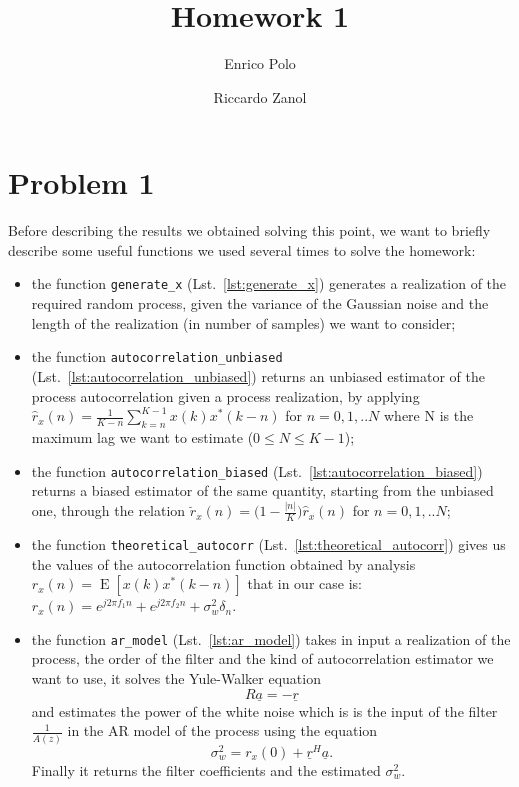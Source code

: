 \documentclass{article}
\author{Enrico Polo \and Riccardo Zanol}
\title{Homework 1}
\newcommand{\inlinecode}[1]{\lstinline[basicstyle=\ttfamily,
    keywordstyle={}]{#1}}
\renewcommand{\vec}[1]{\underline{#1}}
\newcommand{\E}[1]{\operatorname{E}\left[#1\right]}
\begin{document}
\maketitle
\section*{Problem 1}
Before describing the results we obtained solving this point, we want to briefly describe some useful functions we used several times to solve the homework:
\begin{itemize}
 \item the function \inlinecode{generate_x} (Lst.~\ref{lst:generate_x}) generates a realization of the required random process, given the variance of the Gaussian noise and the length of the realization (in number of samples) we want to consider;
 \item the function \inlinecode{autocorrelation_unbiased} (Lst.~\ref{lst:autocorrelation_unbiased}) returns an unbiased estimator of the process autocorrelation given a process realization, by applying $\hat{r}_x(n) = \frac{1}{K-n} \sum_{k=n}^{K-1} {x(k)x^*(k-n)}$ for $n = 0,1,..N$ where N is the maximum lag we want to estimate ($0\leq N \leq K-1$);
 \item the function \inlinecode{autocorrelation_biased} (Lst.~\ref{lst:autocorrelation_biased}) returns a biased estimator of the same quantity, starting from the unbiased one, through the relation $\breve{r}_x(n) = \bigl( 1 - \frac{|n|}{K}\bigr) \hat{r}_x(n)$ for $n = 0,1,..N$;
 \item  the function \inlinecode{theoretical_autocorr} (Lst.~\ref{lst:theoretical_autocorr}) gives us the values of the autocorrelation function obtained by analysis $r_x (n) =  \E{x(k)x^*(k-n)}$ that in our case is: $r_x (n) = e^{j2 \pi f_1n} + e^{j2\pi f_2n} + \sigma_w^2 \delta_n$.
 \item the function \inlinecode{ar_model} (Lst.~\ref{lst:ar_model})
   takes in input a realization of the process, the order of the
   filter and the kind of autocorrelation estimator we want to use, it
   solves the Yule-Walker equation
   \[ R\vec{a} = -\vec{r} \]
   and estimates the power of the white noise which is is the input of
   the filter $\frac{1}{A(z)}$ in the AR model of the process using the equation
   \[ \sigma^2_w = r_x(0) + \vec{r}^H\vec{a} . \]
   Finally it returns the filter coefficients and the estimated $\sigma^2_w$.
\end{itemize}
\end{document}
